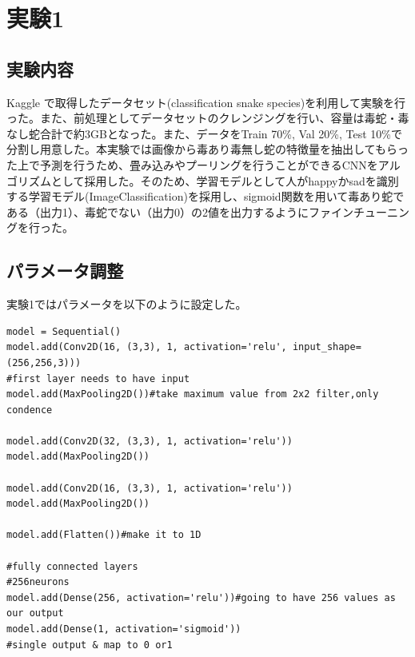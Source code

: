 \documentclass[a4paper, 11pt, titlepage]{jsarticle}
\begin{document}
\section{実験1}
\subsection{実験内容}
Kaggle で取得したデータセット(classification snake species\cite{theme3})を利用して実験を行った。また、前処理としてデータセットのクレンジングを行い、容量は毒蛇・毒なし蛇合計で約3GBとなった。また、データをTrain 70\%, Val 20\%, Test 10\%で分割し用意した。本実験では画像から毒あり毒無し蛇の特徴量を抽出してもらった上で予測を行うため、畳み込みやプーリングを行うことができるCNNをアルゴリズムとして採用した。そのため、学習モデルとして人がhappyかsadを識別する学習モデル(ImageClassification\cite{theme4})を採用し、sigmoid関数を用いて毒あり蛇である（出力1）、毒蛇でない（出力0）の2値を出力するようにファインチューニングを行った。\par

\subsection{パラメータ調整}
実験1ではパラメータを以下のように設定した。\par

\begin{lstlisting}[caption=パラメータ(実験1),label=fuga]
model = Sequential()
model.add(Conv2D(16, (3,3), 1, activation='relu', input_shape=(256,256,3))) 
#first layer needs to have input
model.add(MaxPooling2D())#take maximum value from 2x2 filter,only condence 

model.add(Conv2D(32, (3,3), 1, activation='relu'))
model.add(MaxPooling2D())

model.add(Conv2D(16, (3,3), 1, activation='relu'))
model.add(MaxPooling2D())

model.add(Flatten())#make it to 1D

#fully connected layers
#256neurons
model.add(Dense(256, activation='relu'))#going to have 256 values as our output
model.add(Dense(1, activation='sigmoid'))
#single output & map to 0 or1
\end{lstlisting}
\end{document}
